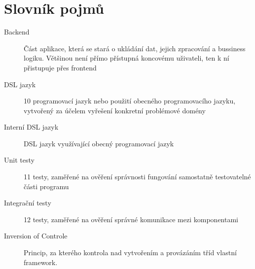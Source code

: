 \chapter{Slovník pojmů}
\begin{description} %
	\item[Backend] Část aplikace, která se stará o ukládání dat, jejich zpracování a bussiness logiku. Většinou není přímo přístupná koncovému uživateli, ten k ní přistupuje přes frontend
	\item[DSL jazyk] 10 programovací jazyk nebo použití obecného programovacího jazyku, vytvořený za účelem vyřešení konkretní problémové domény
	\item[Interní DSL jazyk] DSL jazyk využívající obecný programovací jazyk
	\item[Unit testy] 11 testy, zaměřené na ověření správnosti fungování samostatně testovatelné části programu
	\item[Integrační testy] 12 testy, zaměřené na ověření správné komunikace mezi komponentami
	\item[Inversion of Controle] Princip, za kterého kontrola nad vytvořením a provázáním tříd vlastní framework. 
\end{description}